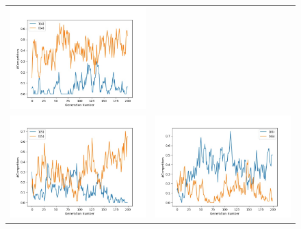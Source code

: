 \documentclass{article}
\begin{document}
\begin{figure}[H]
\begin{adjustbox}{width=0.6\paperwidth}
\begin{tabular}{c c}
			\includegraphics{Codes/Problem_2 Construction_1/Comp_4.jpg} \\ \includegraphics{Codes/Problem_2 Construction_1/Comp_5.jpg} &
			\includegraphics{Codes/Problem_2 Construction_1/Comp_6.jpg}\\

\end{tabular}
\end{adjustbox}
\end{figure}
\end{document}
